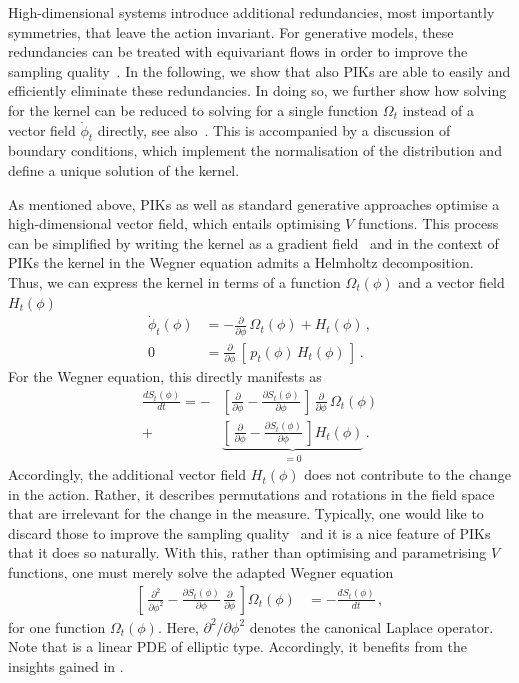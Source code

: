\documentclass[reprint,amsmath,amssymb,aps,pra,superscriptaddress,nofootinbib,twocolumn,floatfix,nolongbibliography]{revtex4-2}
\begin{document}
High-dimensional systems introduce additional redundancies, most importantly symmetries, that leave the action invariant. For generative models, these redundancies can be treated with equivariant flows in order to improve the sampling quality~\cite{Koehler:2020efe,Gerdes:2022eve,Boyda:2020hsi,Gerdes:2024rjk}. In the following, we show that also PIKs are able to easily and efficiently eliminate these redundancies. In doing so, we further show how solving for the kernel can be reduced to solving for a single function $\Omega_t$ instead of a vector field $\dot \phi_{t}$ directly, see also~\cite{Koehler:2020efe,Aarts:2025pmc,Albergo:2025nets}. This is accompanied by a discussion of boundary conditions, which implement the normalisation of the distribution and define a unique solution of the kernel.
%

As mentioned above, PIKs as well as standard generative approaches optimise a high-dimensional vector field, which entails optimising $V$ functions. This process can be simplified by writing the kernel as a gradient field~\cite{Koehler:2020efe,Aarts:2025pmc,Albergo:2025nets} and in the context of PIKs the kernel in the Wegner equation  admits a Helmholtz decomposition. Thus, we can express the kernel in terms of a function $\Omega_t(\phi)$ and a vector field $H_t(\phi)$
%
\begin{align}
    \label{eq:HelmholtzDecomposition}
    \dot{\phi}_t(\phi) &= -\frac{\partial}{\partial \phi}\, \Omega_t(\phi) + H_t(\phi)\,, \\[1ex]
    0 &= \frac{\partial}{\partial \phi}\,\left[\, p_t(\phi)\, H_t(\phi)\,\right]\,. \nonumber
\end{align}
%
For the Wegner equation, this directly manifests as 
%
\begin{align}
    \frac{d S_t(\phi)}{dt} = -&\left[\frac{\partial}{\partial \phi} - \frac{\partial S_t(\phi)}{\partial \phi}\, \right] \, \frac{\partial}{\partial \phi}\, \Omega_t(\phi) \\[1ex]
    + &\underbrace{\left[\,\frac{\partial}{\partial \phi} - \frac{\partial S_t(\phi)}{\partial \phi} \,\right] H_t(\phi)}_{=0}\,. \nonumber
\end{align}
%
Accordingly, the additional vector field $H_t(\phi)$ does not contribute to the change in the action. Rather, it describes permutations and rotations in the field space that are irrelevant for the change in the measure.
Typically, one would like to discard those to improve the sampling quality~\cite{Koehler:2020efe} and it is a nice feature of PIKs that it does so naturally.
With this, rather than optimising and parametrising $V$ functions, one must merely solve the adapted Wegner equation
%
\begin{align}
    \label{eq:WF-ScalarPotential}
    \left[\, \frac{\partial^2}{\partial \phi^2} - \frac{\partial S_t(\phi)}{\partial \phi}\, \frac{\partial}{\partial \phi}\,\right] \Omega_t(\phi) &= - \frac{d S_t(\phi)}{dt}\,,
\end{align}
%
for one function $\Omega_t(\phi)$. Here, $\partial^2/\partial \phi^2$ denotes the canonical Laplace operator. Note that  is a linear PDE of elliptic type. Accordingly, it benefits from the insights gained in .
\end{document}
